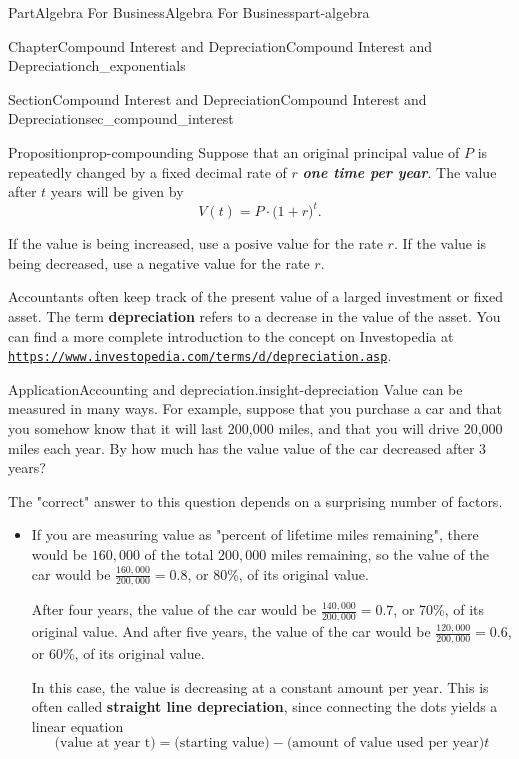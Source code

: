 \documentclass{tufte-book}
\newcommand{\alert}[1]{\textbf{\textit{#1}}}
\newcommand{\terminology}[1]{\textbf{#1}}
\numberwithin{equation}{chapter}
\begin{document}
\begin{partptx}{Part}{Algebra For Business}{}{Algebra For Business}{}{}{part-algebra}
\begin{chapterptx}{Chapter}{Compound Interest and Depreciation}{}{Compound Interest and Depreciation}{}{}{ch_exponentials}
\begin{sectionptx}{Section}{Compound Interest and Depreciation}{}{Compound Interest and Depreciation}{}{}{sec_compound_interest}
\begin{proposition}{Proposition}{}{}{prop-compounding}%
Suppose that an original principal value of \(P\) is repeatedly changed by a fixed decimal rate of \(r\) \alert{one time per year}.  The value after \(t\) years will be given by%
\begin{equation*}
V(t) = P \cdot \Big( 1 + r \Big)^t\text{.}
\end{equation*}
%
\par
If the value is being increased, use a posive value for the rate \(r\).  If the value is being decreased, use a negative value for the rate \(r\).%
\end{proposition}
Accountants often keep track of the present value of a larged investment or fixed asset. The term \terminology{depreciation} refers to a decrease in the value of the asset. You can find a more complete introduction to the concept on Investopedia at \href{https://www.investopedia.com/terms/d/depreciation.asp}{\nolinkurl{https://www.investopedia.com/terms/d/depreciation.asp}}.%
\begin{insight}{Application}{Accounting and depreciation.}{insight-depreciation}%
Value can be measured in many ways. For example, suppose that you purchase a car and that you somehow know that it will last 200,000 miles, and that you will drive 20,000 miles each year. By how much has the value value of the car decreased after 3 years?%
\par
The "correct" answer to this question depends on a surprising number of factors.%
\begin{itemize}[label=\textbullet]
\item{}If you are measuring value as "percent of lifetime miles remaining", there would be \(160,000\) of the total \(200,000\) miles remaining, so the value of the car would be \(\frac{160,000}{200,000} = 0.8\), or 80\%, of its original value.%
\par
After four years, the value of the car would be  \(\frac{140,000}{200,000} = 0.7\), or 70\%, of its original value. And after five years, the value of the car would be  \(\frac{120,000}{200,000} = 0.6\), or 60\%, of its original value.%
\par
In this case, the value is decreasing at a constant amount per year.  This is often called \terminology{straight line depreciation}, since connecting the dots yields a linear equation%
\begin{equation*}
\text{(value at year t)} = \text{(starting value)} - \text{(amount of value used per year)} t
\end{equation*}

\end{itemize}
\end{insight}
\end{sectionptx}
\end{chapterptx}
\end{partptx}
\end{document}
